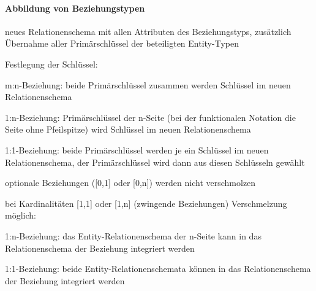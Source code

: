 \documentclass[a4paper]{article}
\begin{document}
\begin{multicols}{3}
    \paragraph{Abbildung von Beziehungstypen}
    \begin{itemize*}
        \item neues Relationenschema mit allen Attributen des Beziehungstyps, zusätzlich Übernahme aller Primärschlüssel der beteiligten Entity-Typen
        \item Festlegung der Schlüssel:
        \begin{itemize*}
            \item m:n-Beziehung: beide Primärschlüssel zusammen werden Schlüssel im neuen Relationenschema
            \item 1:n-Beziehung: Primärschlüssel der n-Seite (bei der funktionalen Notation die Seite ohne Pfeilspitze) wird Schlüssel im neuen Relationenschema
            \item 1:1-Beziehung: beide Primärschlüssel werden je ein Schlüssel im neuen Relationenschema, der Primärschlüssel wird dann aus diesen Schlüsseln gewählt
        \end{itemize*}
        \item optionale Beziehungen ([0,1] oder [0,n]) werden nicht verschmolzen
        \item bei Kardinalitäten [1,1] oder [1,n] (zwingende Beziehungen) Verschmelzung möglich:
        \begin{itemize*}
            \item 1:n-Beziehung: das Entity-Relationenschema der n-Seite kann in das Relationenschema der Beziehung integriert werden
            \item 1:1-Beziehung: beide Entity-Relationenschemata können in das Relationenschema der Beziehung integriert werden
        \end{itemize*}
    \end{itemize*}


\end{multicols}
\end{document}
